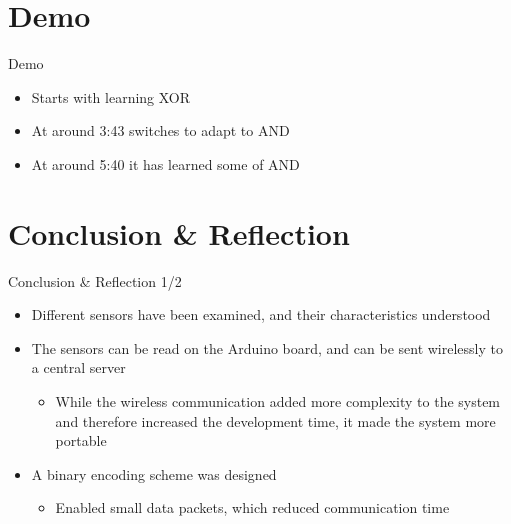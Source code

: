 \section{Demo}
\begin{frame}{Demo}
	\begin{itemize}
		\item Starts with learning XOR
		\item At around 3:43 switches to adapt to AND
		\item At around 5:40 it has learned some of AND
	\end{itemize}
\end{frame}

\section{Conclusion \& Reflection}
\begin{frame}{Conclusion \& Reflection 1/2}
	\begin{itemize}
    \item Different sensors have been examined, and their characteristics understood
    \item The sensors can be read on the Arduino board, and can be sent wirelessly to a central server
      \begin{itemize}
        \item While the wireless communication added more complexity to the system and therefore increased the development time, it made the system more portable
      \end{itemize}
    \item A binary encoding scheme was designed
      \begin{itemize}
        \item Enabled small data packets, which reduced communication time
      \end{itemize}
  \end{itemize}
\end{frame}

